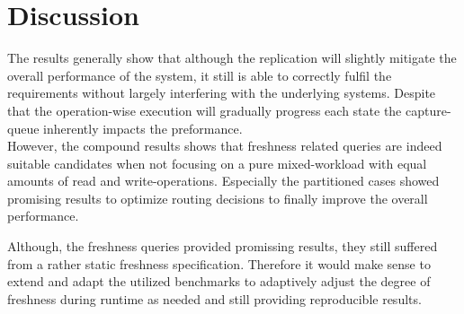 



\pagebreak
\section{Discussion}
\label{sec:discussion}

The results generally show that although the replication will slightly mitigate the overall performance of the system, it still is able to correctly fulfil the 
requirements without largely interfering with the underlying systems. 
Despite that the operation-wise execution will gradually progress each state the capture-queue inherently impacts the preformance.\\

However, the compound results shows that freshness related queries are indeed suitable candidates when not focusing on a pure mixed-workload with equal amounts of read and write-operations.
Especially the partitioned cases showed promising results to optimize routing decisions to finally improve the overall performance.


Although, the freshness queries provided promissing results, they still suffered from a rather static freshness specification. 
Therefore it would make sense to extend and adapt the utilized benchmarks to adaptively adjust the degree of freshness during runtime
as needed and still providing reproducible results.







